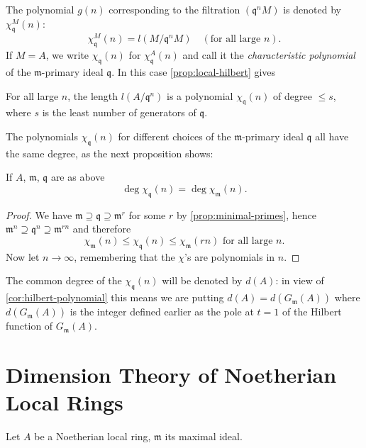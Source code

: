 The polynomial $g(n)$ corresponding to the filtration $(\mathfrak{q}^n M)$ is denoted by $\chi_{\mathfrak{q}}^M(n)$:
\[
    \chi_{\mathfrak{q}}^M(n) = l(M/\mathfrak{q}^n M) \quad (\text{for all large } n).
\]
If $M = A$, we write $\chi_{\mathfrak{q}}(n)$ for $\chi_{\mathfrak{q}}^A(n)$ and call it the \emph{characteristic polynomial} of the $\mathfrak{m}$-primary ideal $\mathfrak{q}$. In this case \eqref{prop:local-hilbert} gives

\begin{corollary}\label{cor:char-poly}
For all large $n$, the length $l(A/\mathfrak{q}^n)$ is a polynomial $\chi_{\mathfrak{q}}(n)$ of degree $\leq s$, where $s$ is the least number of generators of $\mathfrak{q}$.
\end{corollary}

The polynomials $\chi_{\mathfrak{q}}(n)$ for different choices of the $\mathfrak{m}$-primary ideal $\mathfrak{q}$ all have the same degree, as the next proposition shows:

\begin{proposition}\label{prop:char-poly-degree}
If $A$, $\mathfrak{m}$, $\mathfrak{q}$ are as above
\[
    \deg \chi_{\mathfrak{q}}(n) = \deg \chi_{\mathfrak{m}}(n).
\]
\end{proposition}

\begin{proof}
We have $\mathfrak{m} \supseteq \mathfrak{q} \supseteq \mathfrak{m}^r$ for some $r$ by \eqref{prop:minimal-primes}, hence $\mathfrak{m}^n \supseteq \mathfrak{q}^n \supseteq \mathfrak{m}^{rn}$ and therefore
\[
    \chi_{\mathfrak{m}}(n) \leq \chi_{\mathfrak{q}}(n) \leq \chi_{\mathfrak{m}}(rn) \text{ for all large } n.
\]
Now let $n \to \infty$, remembering that the $\chi$'s are polynomials in $n$.
\end{proof}

The common degree of the $\chi_{\mathfrak{q}}(n)$ will be denoted by $d(A)$: in view of \eqref{cor:hilbert-polynomial} this means we are putting $d(A) = d(G_{\mathfrak{m}}(A))$ where $d(G_{\mathfrak{m}}(A))$ is the integer defined earlier as the pole at $t = 1$ of the Hilbert function of $G_{\mathfrak{m}}(A)$.

\section*{Dimension Theory of Noetherian Local Rings}
Let $A$ be a Noetherian local ring, $\mathfrak{m}$ its maximal ideal.

